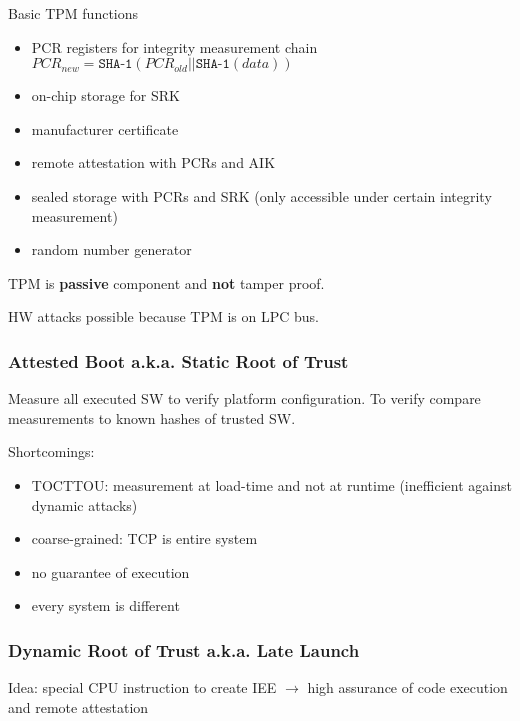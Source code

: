 Basic TPM functions
\begin{itemize}
    \item PCR registers for integrity measurement chain $PCR_{new} = \texttt{SHA-1}(PCR_{old}|| \texttt{SHA-1}(data))$
    \item on-chip storage for SRK
    \item manufacturer certificate
    \item remote attestation with PCRs and AIK
    \item sealed storage with PCRs and SRK (only accessible under certain integrity measurement)
    \item random number generator
\end{itemize}
TPM is \textbf{passive} component and \textbf{not} tamper proof.

HW attacks possible because TPM is on LPC bus.

\subsubsection{Attested Boot a.k.a. Static Root of Trust}
Measure all executed SW to verify platform configuration. To verify compare measurements to known hashes of trusted SW.

Shortcomings:

\begin{itemize}
    \item TOCTTOU: measurement at load-time and not at runtime (inefficient against dynamic attacks)
    \item coarse-grained: TCP is entire system
    \item no guarantee of execution
    \item every system is different
\end{itemize}

\subsubsection{Dynamic Root of Trust a.k.a. Late Launch}
Idea: special CPU instruction to create IEE $\xrightarrow{}$ high assurance of code execution and remote attestation

